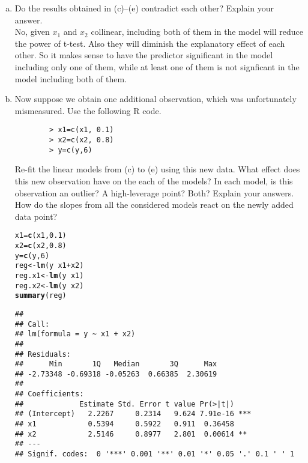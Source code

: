 \documentclass[12pt]{article}\usepackage[]{graphicx}\usepackage[]{color}
\makeatletter
\newcommand{\hlnum}[1]{\textcolor[rgb]{0.686,0.059,0.569}{#1}}%
\newcommand{\hlopt}[1]{\textcolor[rgb]{0,0,0}{#1}}%
\newcommand{\hlstd}[1]{\textcolor[rgb]{0.345,0.345,0.345}{#1}}%
\newcommand{\hlkwb}[1]{\textcolor[rgb]{0.69,0.353,0.396}{#1}}%
\newcommand{\hlkwd}[1]{\textcolor[rgb]{0.737,0.353,0.396}{\textbf{#1}}}%
\newenvironment{kframe}{%
 \def\at@end@of@kframe{}%
 \ifinner\ifhmode%
  \def\at@end@of@kframe{\end{minipage}}%
  \begin{minipage}{\columnwidth}%
 \fi\fi%
 \def\FrameCommand##1{\hskip\@totalleftmargin \hskip-\fboxsep
 \colorbox{shadecolor}{##1}\hskip-\fboxsep
     \hskip-\linewidth \hskip-\@totalleftmargin \hskip\columnwidth}%
 \MakeFramed {\advance\hsize-\width
   \@totalleftmargin\z@ \linewidth\hsize
   \@setminipage}}%
 {\par\unskip\endMakeFramed%
 \at@end@of@kframe}
\newenvironment{knitrout}{}{} %
\theoremstyle{definition}
\makeatother
\begin{document}
\begin{enumerate}[1.]
\begin{enumerate}[(a)]
      \item Do the results obtained in (c)–(e) contradict each other? Explain your answer.\\[10pt]
      No, given $x_1$ and $x_2$ collinear, including both of them in the model will reduce the power of t-test. Also they will diminish the explanatory effect of each other. So it makes sense to have the predictor significant in the model including only one of them, while at least one of them is not signficant in the model including both of them.

      \item Now suppose we obtain one additional observation, which was unfortunately mismeasured. Use the following R code.\\[-20pt]
        \begin{verbatim}
        > x1=c(x1, 0.1)
        > x2=c(x2, 0.8)
        > y=c(y,6)
        \end{verbatim}
        \vspace*{-20pt}
        Re-fit the linear models from (c) to (e) using this new data. What effect does this new observation have on the each of the models? In each model, is this observation an outlier? A high-leverage point? Both? Explain your answers. How do the slopes from all the considered models react on the newly added data point?
\begin{knitrout}
\color{fgcolor}\begin{kframe}
\begin{alltt}
\hlstd{x1}\hlkwb{=}\hlkwd{c}\hlstd{(x1,} \hlnum{0.1}\hlstd{)}
\hlstd{x2}\hlkwb{=}\hlkwd{c}\hlstd{(x2,} \hlnum{0.8}\hlstd{)}
\hlstd{y}\hlkwb{=}\hlkwd{c}\hlstd{(y,}\hlnum{6}\hlstd{)}
\hlstd{reg} \hlkwb{<-} \hlkwd{lm}\hlstd{(y} \hlopt{~} \hlstd{x1} \hlopt{+} \hlstd{x2)}
\hlstd{reg.x1} \hlkwb{<-} \hlkwd{lm}\hlstd{(y} \hlopt{~} \hlstd{x1)}
\hlstd{reg.x2} \hlkwb{<-} \hlkwd{lm}\hlstd{(y} \hlopt{~} \hlstd{x2)}
\hlkwd{summary}\hlstd{(reg)}
\end{alltt}
\begin{verbatim}
## 
## Call:
## lm(formula = y ~ x1 + x2)
## 
## Residuals:
##      Min       1Q   Median       3Q      Max 
## -2.73348 -0.69318 -0.05263  0.66385  2.30619 
## 
## Coefficients:
##             Estimate Std. Error t value Pr(>|t|)    
## (Intercept)   2.2267     0.2314   9.624 7.91e-16 ***
## x1            0.5394     0.5922   0.911  0.36458    
## x2            2.5146     0.8977   2.801  0.00614 ** 
## ---
## Signif. codes:  0 '***' 0.001 '**' 0.01 '*' 0.05 '.' 0.1 ' ' 1

\end{verbatim}
\end{kframe}
\end{knitrout}
\end{enumerate}
\end{enumerate}
\end{document}
